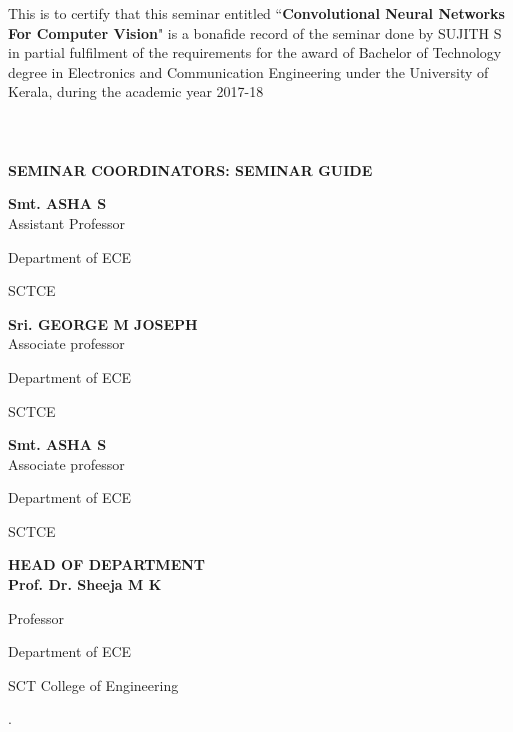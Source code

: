 \documentclass[12pt]{article}
\begin{document}
 \par This is to certify that this seminar entitled “\textbf{Convolutional Neural Networks For Computer Vision}" is a bonafide record of the seminar done by  SUJITH S in partial fulfilment of the requirements for the award of Bachelor of Technology degree in Electronics and Communication Engineering under the University of Kerala,   during the  academic year 2017-18\\
 \\ \\ \\ \textbf{SEMINAR COORDINATORS: \hspace{55mm} SEMINAR GUIDE\\ \vspace{6mm}}

\begin{center}
\begin{multicols}{3}

    
\textbf{\small Smt. ASHA S}
\vspace{2mm}\\Assistant Professor

Department of ECE

SCTCE

\columnbreak %

\textbf{\small Sri. GEORGE M JOSEPH}
\vspace{2mm}\\Associate professor

Department of ECE 

SCTCE


\columnbreak

\textbf{\small Smt. ASHA S}
\vspace{2mm}\\Associate professor

Department of ECE

SCTCE

\end{multicols}
\vspace{20mm}

\textbf{\large HEAD OF DEPARTMENT}
\vspace{2mm}\\
\textbf{\small Prof. Dr. Sheeja M K}

Professor

Department of ECE

SCT College of Engineering
\end{center}
\newpage
{}
.
\vspace{25mm}
\end{document}
